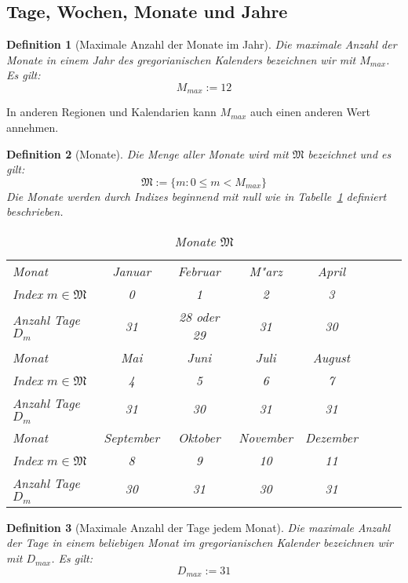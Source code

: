 \documentclass[a4paper]{article}
\newcommand*{\months}{\mathfrak{M}}
\numberwithin{equation}{section}
\newtheorem{dfn}{Definition}
\begin{document}
\subsection{Tage, Wochen, Monate und Jahre}
\begin{dfn}[Maximale Anzahl der Monate im Jahr]
  Die maximale Anzahl der Monate in einem Jahr des gregorianischen Kalenders
  bezeichnen wir mit $M_{max}$. Es gilt:
  \begin{equation}M_{max} := 12\end{equation}
\end{dfn}
\noindent In anderen Regionen und Kalendarien kann $M_{max}$ auch einen anderen
Wert annehmen.
\begin{dfn}[Monate]
  Die Menge aller Monate wird mit $\months$ bezeichnet und es gilt:
  \begin{equation}\months := \{ m : 0 \le m < M_{max}\}\end{equation}
  Die Monate werden durch Indizes beginnend mit null wie in
  Tabelle~\ref{tab:months} definiert beschrieben.
  \par
  \begin{table}[ht]
  \caption{Monate $\months$}\label{tab:months}
  \begin{tabularx}{\textwidth}{X|ccccccc}
    \hline
    Monat & Januar & Februar & M"arz & April \\
    Index $m \in \months$ & 0 & 1 & 2 & 3 \\
    Anzahl Tage $D_m$ & 31 & 28 oder 29 & 31 & 30 \\
    \hline
    Monat & Mai & Juni & Juli & August \\
    Index $m \in \months$ & 4 & 5 & 6 & 7 \\
    Anzahl Tage $D_m$ & 31 & 30 & 31 & 31 \\
    \hline
    Monat & September & Oktober & November & Dezember \\
    Index $m \in \months$ & 8 & 9 & 10 & 11 \\
    Anzahl Tage $D_m$ & 30 & 31 & 30 & 31 \\
    \hline
  \end{tabularx}\end{table}
\end{dfn}
\begin{dfn}[Maximale Anzahl der Tage jedem Monat]
  Die maximale Anzahl der Tage in einem beliebigen Monat im gregorianischen
  Kalender bezeichnen wir mit
  $D_{max}$. Es gilt:
  \begin{equation}D_{max} := 31\end{equation}
\end{dfn}
\end{document}
